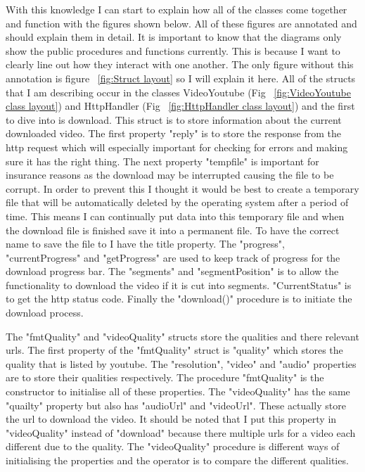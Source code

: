 \documentclass{article}
\begin{document}
With this knowledge I can start to explain how all of the classes come together and
function with the figures shown below. All of these figures are annotated and should
explain them in detail. It is important to know that the diagrams only show the
public procedures and functions currently. This is because I want to clearly line
out how they interact with one another. The only figure without this annotation is
figure ~\ref{fig:Struct layout} so I will explain it here. All of the structs that I
am describing occur in the classes VideoYoutube (Fig ~\ref{fig:VideoYoutube class layout})
and HttpHandler (Fig ~\ref{fig:HttpHandler class layout}) and the first to dive into is
download. This struct is to store information about the current downloaded video. The
first property "reply" is to store the response from the http request which will
especially important for checking for errors and making sure it has the right thing. The
next property "tempfile" is important for insurance reasons as the download may be
interrupted causing the file to be corrupt. In order to prevent this I thought it would
be best to create a temporary file that will be automatically deleted by the operating
system after a period of time. This means I can continually put data into this temporary
file and when the download file is finished save it into a permanent file. To have the
correct name to save the file to I have the title property. The "progress",
"currentProgress" and "getProgress" are used to keep track of progress for the download
progress bar. The "segments" and "segmentPosition" is to allow the functionality to
download the video if it is cut into segments. "CurrentStatus" is to get the http status
code. Finally the "download()" procedure is to initiate the download process.

The "fmtQuality" and "videoQuality" structs store the qualities and there relevant
urls. The first property of the "fmtQuality" struct is "quality" which stores the quality
that is listed by youtube. The "resolution", "video" and "audio" properties are to store
their qualities respectively. The procedure "fmtQuality" is the constructor to initialise
all of these properties. The "videoQuality" has the same "quailty" property but also has
"audioUrl" and "videoUrl". These actually store the url to download the video. It should be
noted that I put this property in "videoQuality" instead of "download" because there
multiple urls for a video each different due to the quality. The "videoQuality" procedure
is different ways of initialising the properties and the operator is to compare the
different qualities.
\end{document}
